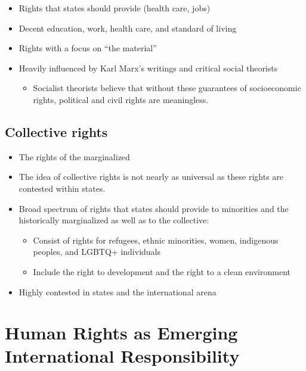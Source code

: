 \documentclass[
]{book}
\providecommand{\tightlist}{%
  \setlength{\itemsep}{0pt}\setlength{\parskip}{0pt}}
\begin{document}
\begin{itemize}
\item
  Rights that states should provide (health care, jobs)
\item
  Decent education, work, health care, and standard of living
\item
  Rights with a focus on ``the material''
\item
  Heavily influenced by Karl Marx's writings and critical social theorists

  \begin{itemize}
  \tightlist
  \item
    Socialist theorists believe that without these guarantees of socioeconomic rights, political and civil rights are meaningless.
  \end{itemize}
\end{itemize}

\hypertarget{collective-rights}{%
\subsection{Collective rights}\label{collective-rights}}

\begin{itemize}
\item
  The rights of the marginalized
\item
  The idea of collective rights is not nearly as universal as these rights are contested within states.
\item
  Broad spectrum of rights that states should provide to minorities and the historically marginalized as well as to the collective:

  \begin{itemize}
  \item
    Consist of rights for refugees, ethnic minorities, women, indigenous peoples, and LGBTQ+ individuals
  \item
    Include the right to development and the right to a clean environment
  \end{itemize}
\item
  Highly contested in states and the international arena
\end{itemize}

\hypertarget{human-rights-as-emerging-international-responsibility}{%
\section{Human Rights as Emerging International Responsibility}\label{human-rights-as-emerging-international-responsibility}}
\end{document}
